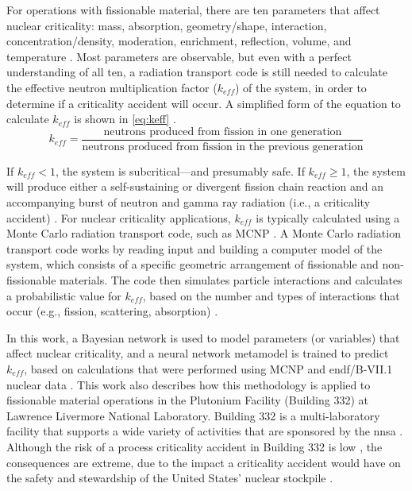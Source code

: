 For operations with fissionable material, there are ten parameters that affect nuclear criticality: mass, absorption, geometry/shape, interaction, concentration/density, moderation, enrichment, reflection, volume, and temperature \cite{knief}.
Most parameters are observable, but even with a perfect understanding of all ten, a radiation transport code is still needed to calculate the effective neutron multiplication factor ($k_{eff}$) of the system, in order to determine if a criticality accident will occur.
A simplified form of the equation to calculate $k_{eff}$ is shown in \ref{eq:keff} \cite{lamarsh}.
%
\begin{equation}
  \label{eq:keff}
  k_{eff} = \frac{\mbox{neutrons produced from fission in one generation}}{\mbox{neutrons produced from fission in the previous generation}}
\end{equation}

If $k_{eff} < 1$, the system is subcritical---and presumably safe.
If $k_{eff} \geq 1$, the system will produce either a self-sustaining or divergent fission chain reaction and an accompanying burst of neutron and gamma ray radiation (i.e., a criticality accident) \cite{knief,lamarsh}.
For nuclear criticality applications, $k_{eff}$ is typically calculated using a Monte Carlo radiation transport code, such as MCNP \cite{mcnp}.
A Monte Carlo radiation transport code works by reading input and building a computer model of the system, which consists of a specific geometric arrangement of fissionable and non-fissionable materials.
The code then simulates particle interactions and calculates a probabilistic value for $k_{eff}$, based on the number and types of interactions that occur (e.g., fission, scattering, absorption) \cite{mcnp}.

In this work, a Bayesian network is used to model parameters (or variables) that affect nuclear criticality, and a neural network metamodel is trained to predict $k_{eff}$, based on calculations that were performed using MCNP \cite{mcnp} and \gls{endf}/B-VII.1 nuclear data \cite{chadwick2011}.
This work also describes how this methodology is applied to fissionable material operations in the Plutonium Facility (Building 332) at Lawrence Livermore National Laboratory.
Building 332 is a multi-laboratory facility that supports a wide variety of activities that are sponsored by the \gls{nnsa} \cite{doe2005}.
Although the risk of a process criticality accident in Building 332 is low \cite{doe2005}, the consequences are extreme, due to the impact a criticality accident would have on the safety and stewardship of the United States' nuclear stockpile \cite{opus,dod}.

